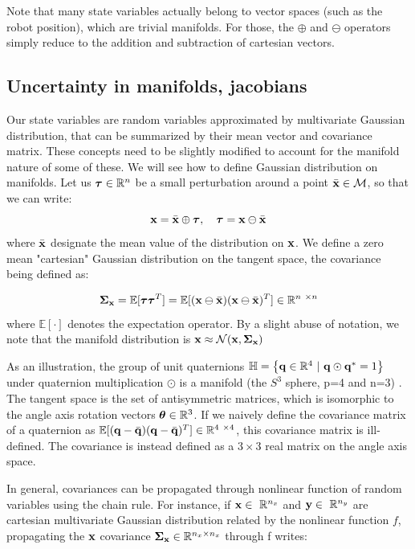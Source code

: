 Note that many state variables actually belong to vector spaces (such as the robot position), which are trivial manifolds. For those, the $\oplus$ and $\ominus$ operators
simply reduce to the addition and subtraction of cartesian vectors.  



\subsection{Uncertainty in manifolds, jacobians}
Our state variables are random variables approximated by multivariate Gaussian distribution, that can be summarized by their mean vector and covariance matrix.
These concepts need to be slightly modified to account for the manifold nature of some of these. We will see how to define Gaussian distribution on manifolds.
Let us ${\bm \tau} \in \mathbb{R}^n$ be a small perturbation around a point $\bar{{\bf x}} \in \mathcal{M}$, so that we can write:
%
\begin{equation}
    {\bf x} = \bar{{\bf x}} \oplus {\bm \tau}, \quad {\bm \tau} = {\bf x} \ominus \bar{{\bf x}}
\end{equation}
%
where $\bar{{\bf x}}$ designate the mean value of the distribution on ${\bf x}$. 
We define a zero mean "cartesian" Gaussian distribution on the tangent space, the covariance being defined as:

\begin{equation}
    \Cov_{\bfx} = \mathbb{E}[\bftau\bftau^T] = \mathbb{E}[(\bfx \ominus \bar{\bfx})(\bfx \ominus \bar{\bfx})^T] \in \Reals^{n \times n}
\end{equation}
%
where $\mathbb{E}[\cdot]$ denotes the expectation operator.
By a slight abuse of notation, we note that the manifold distribution is ${\bf x} \approx \mathcal{N}({{\bf x}},{{\bm \Sigma}_{{\bf x}}})$

As an illustration, the group of unit quaternions $\mathbb{H} = \left\{ {\bf q} \in \mathbb{R}^4~|~{\bf q} \odot {\bf q}^*=1 \right\}$ under quaternion multiplication 
$\odot$ is a manifold (the $S^3$ sphere, p=4 and n=3) \cite{sola2012quaternion}. 
The tangent space is the set of antisymmetric matrices, which is isomorphic to the angle axis rotation vectors ${\bm \theta} \in \mathbb{R}^3$.
If we naively define the covariance matrix of a quaternion as \mbox{$\mathbb{E}[(\bfq - \bar{\bfq})(\bfq - \bar{\bfq})^T] \in \Reals^{4 \times 4}$}, 
this covariance matrix is ill-defined. The covariance is instead defined as a $3 \times 3$ real matrix on the angle axis space.

In general, covariances can be propagated through nonlinear function of random variables using the chain rule. For instance, if $\bfx \in \Reals^{n_x}$ and 
$\bfy \in \Reals^{n_y}$ are cartesian multivariate Gaussian distribution related by the nonlinear function $f$, propagating the ${\bf x}$ covariance 
${\bm \Sigma}_{{\bf x}} \in \mathbb{R}^{n_x \times n_x}$ through f writes:

